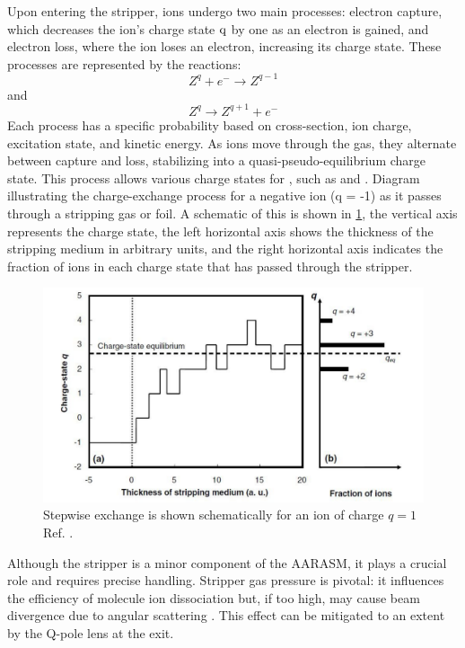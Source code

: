 Upon entering the stripper, ions undergo two main processes: electron capture, which decreases the ion’s charge state \(\ce{q}\) by one as an electron is gained, and electron loss, where the ion loses an electron, increasing its charge state. These processes are represented by the reactions:
\begin{equation}
    Z^{q} + e^{-} \rightarrow Z^{q-1}
\end{equation}
and
\begin{equation}
    Z^{q} \rightarrow Z^{q+1} + e^{-}
\end{equation}
Each process has a specific probability based on cross-section, ion charge, excitation state, and kinetic energy. As ions move through the gas, they alternate between capture and loss, stabilizing into a quasi-pseudo-equilibrium charge state. This process allows various charge states for , such as  and . Diagram illustrating the charge-exchange process for a negative ion (q = -1) as it passes through a stripping gas or foil. A schematic of this is shown in \cref{fig:hargestateequlibrium}, the vertical axis represents the charge state, the left horizontal axis shows the thickness of the stripping medium in arbitrary units, and the right horizontal axis indicates the fraction of ions in each charge state that has passed through the stripper.

\begin{figure}[ht]
    \centering
    \includegraphics[width=1\linewidth]{B/chargestateequlibrium.pdf}
    \caption{Stepwise exchange is shown schematically for an ion of charge $q=1$ Ref. \cite{Whitlow2005}.}
    \label{fig:hargestateequlibrium}
\end{figure}



Although the stripper is a minor component of the AARASM, it plays a crucial role and requires precise handling. Stripper gas pressure is pivotal: it influences the efficiency of molecule ion dissociation but, if too high, may cause beam divergence due to angular scattering \cite{HVEE2013}. This effect can be mitigated to an extent by the Q-pole lens at the exit.

